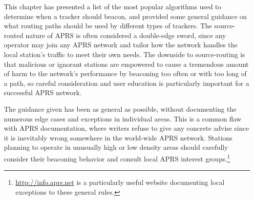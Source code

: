 This chapter has presented a list of the most popular algorithms
used to determine when a tracker should beacon, and provided some
general guidance on what routing paths should be used by different types
of trackers.
The source-routed nature of APRS is often considered a double-edge sword,
since any operator may join any APRS network and tailor how the network
handles the local station's traffic to meet their own needs.
The downside to source-routing is that malicious or ignorant stations
are empowered to cause a tremendous amount of harm to the network's performance
by beaconing too often or with too long of a path,
so careful consideration and user education is particularly important for
a successful APRS network.

The guidance given has been as general as possible,
without documenting the numerous edge cases and exceptions in individual areas.
This is a common flaw with APRS documentation,
where writers refuse to give any concrete advise since it is inevitably wrong
somewhere in the world-wide APRS network.
Stations planning to operate in unusually high or low density areas should
carefully consider their beaconing behavior and consult local APRS interest
groups.\footnote{\url{http://info.aprs.net} is a particularly useful website
documenting local exceptions to these general rules.}
